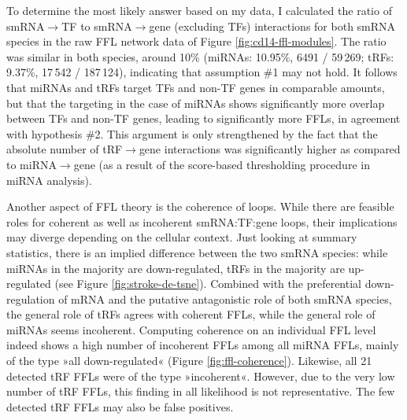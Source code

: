 To determine the most likely answer based on my data, I calculated the ratio of smRNA$\to$TF to smRNA$\to$gene (excluding TFs) interactions for both smRNA species in the raw FFL network data of Figure \ref{fig:cd14-ffl-modules}. The ratio was similar in both species, around 10\% (miRNAs: 10.95\%, 6491 / 59\,269; tRFs: 9.37\%, 17\,542 / 187\,124), indicating that assumption \#1 may not hold. It follows that miRNAs and tRFs target TFs and non-TF genes in comparable amounts, but that the targeting in the case of miRNAs shows significantly more overlap between TFs and non-TF genes, leading to significantly more FFLs, in agreement with hypothesis \#2. This argument is only strengthened by the fact that the absolute number of tRF$\to$gene interactions was significantly higher as compared to miRNA$\to$gene (as a result of the score-based thresholding procedure in miRNA analysis).

Another aspect of FFL theory is the coherence of loops. While there are feasible roles for coherent as well as incoherent smRNA:TF:gene loops, their implications may diverge depending on the cellular context. Just looking at summary statistics, there is an implied difference between the two smRNA species: while miRNAs in the majority are down-regulated, tRFs in the majority are up-regulated (see Figure \ref{fig:stroke-de-tsne}). Combined with the preferential down-regulation of mRNA and the putative antagonistic role of both smRNA species, the general role of tRFs agrees with coherent FFLs, while the general role of miRNAs seems incoherent. Computing coherence on an individual FFL level indeed shows a high number of incoherent FFLs among all miRNA FFLs, mainly of the type »all down-regulated« (Figure \ref{fig:ffl-coherence}). Likewise, all 21 detected tRF FFLs were of the type »incoherent«. However, due to the very low number of tRF FFLs, this finding in all likelihood is not representative. The few detected tRF FFLs may also be false positives.

